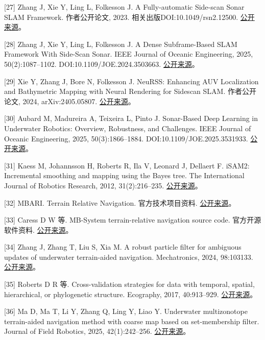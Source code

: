 {[}27{]} Zhang J, Xie Y, Ling L, Folkesson J. A Fully-automatic Side-scan Sonar SLAM Framework. 作者公开论文, 2023. 相关出版DOI:10.1049/rsn2.12500. \href{https://arxiv.org/abs/2304.01854}{公开来源}。

{[}28{]} Zhang J, Xie Y, Ling L, Folkesson J. A Dense Subframe-Based SLAM Framework With Side-Scan Sonar. IEEE Journal of Oceanic Engineering, 2025, 50(2):1087--1102. DOI:10.1109/JOE.2024.3503663. \href{https://arxiv.org/abs/2312.13802}{公开来源}。

{[}29{]} Xie Y, Zhang J, Bore N, Folkesson J. NeuRSS: Enhancing AUV Localization and Bathymetric Mapping with Neural Rendering for Sidescan SLAM. 作者公开论文, 2024, arXiv:2405.05807. \href{https://arxiv.org/abs/2405.05807}{公开来源}。

{[}30{]} Aubard M, Madureira A, Teixeira L, Pinto J. Sonar-Based Deep Learning in Underwater Robotics: Overview, Robustness, and Challenges. IEEE Journal of Oceanic Engineering, 2025, 50(3):1866--1884. DOI:10.1109/JOE.2025.3531933. \href{https://arxiv.org/abs/2412.11840}{公开来源}。

{[}31{]} Kaess M, Johannsson H, Roberts R, Ila V, Leonard J, Dellaert F. iSAM2: Incremental smoothing and mapping using the Bayes tree. The International Journal of Robotics Research, 2012, 31(2):216--235. \href{https://www.borg.cc.gatech.edu/papers/kaess12ijrr.html}{公开来源}。

{[}32{]} MBARI. Terrain Relative Navigation. 官方技术项目资料. \href{https://www.mbari.org/project/terrain-relative-navigation/}{公开来源}。

{[}33{]} Caress D W 等. MB-System terrain-relative navigation source code. 官方开源软件资料. \href{https://github.com/dwcaress/MB-System}{公开来源}。

{[}34{]} Zhang J, Zhang T, Liu S, Xia M. A robust particle filter for ambiguous updates of underwater terrain-aided navigation. Mechatronics, 2024, 98:103133. \href{https://doi.org/10.1016/j.mechatronics.2023.103133}{公开来源}。

{[}35{]} Roberts D R 等. Cross-validation strategies for data with temporal, spatial, hierarchical, or phylogenetic structure. Ecography, 2017, 40:913--929. \href{https://doi.org/10.1111/ecog.02881}{公开来源}。

{[}36{]} Ma D, Ma T, Li Y, Zhang Q, Ling Y, Liao Y. Underwater multizonotope terrain-aided navigation method with coarse map based on set-membership filter. Journal of Field Robotics, 2025, 42(1):242--256. \href{https://onlinelibrary.wiley.com/doi/abs/10.1002/rob.22407}{公开来源}。

